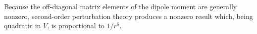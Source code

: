 Because the off-diagonal matrix elements of the dipole moment are generally nonzero, second-order perturbation theory produces a nonzero result which, being quadratic in $V$, is proportional to $1/r^6$.
